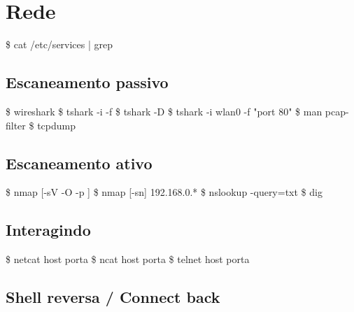 \documentclass{refcard}
\begin{document}
\pagebreak

\section{Rede}

\begin{ldesc}
	 \$ cat /etc/services | grep 
\end{ldesc}

\subsection{Escaneamento passivo}

\begin{ldesc}
	  \$ wireshark
	              \$ tshark -i  -f 
	              \$ tshark -D
	            \$ tshark -i wlan0 -f "port 80"
	                \$ man pcap-filter
	      \$ tcpdump
\end{ldesc}

\subsection{Escaneamento ativo}

\begin{ldesc}
	           \$ nmap [-sV -O -p ] 
	      \$ nmap [-sn] 192.168.0.*
	      \$ nslookup -query=txt 
	  \$ dig \I{[@srv]} 
\end{ldesc}

\subsection{Interagindo}

\begin{ldesc}
	        \$ netcat host porta
	     \$ ncat host porta
	 \$ telnet host porta
\end{ldesc}


\subsection{Shell reversa / Connect back}
\end{document}

